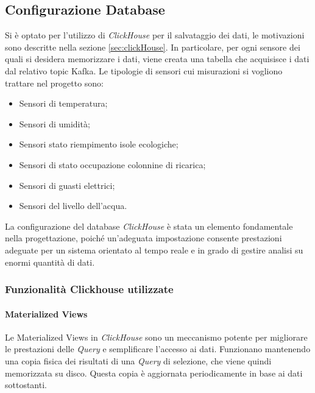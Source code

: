 \subsection{Configurazione Database}
Si è optato per l'utilizzo di \textit{ClickHouse} per il salvataggio dei dati, le motivazioni sono descritte nella sezione \ref{sec:clickHouse}. In particolare, per ogni sensore dei quali si desidera memorizzare i dati, viene creata una tabella che acquisisce i dati dal relativo topic Kafka.
Le tipologie di sensori cui misurazioni si vogliono trattare nel progetto sono:
\begin{itemize}
    \item Sensori di temperatura;
    \item Sensori di umidità;
    \item Sensori stato riempimento isole ecologiche;
    \item Sensori di stato occupazione colonnine di ricarica;
    \item Sensori di guasti elettrici;
    \item Sensori del livello dell'acqua.
\end{itemize}

La configurazione del database \textit{ClickHouse} è stata un elemento fondamentale nella progettazione, poiché un'adeguata impostazione consente prestazioni adeguate per un sistema orientato al tempo reale e in grado di gestire analisi su enormi quantità di dati.

\subsubsection{Funzionalità Clickhouse utilizzate}
\paragraph{Materialized Views}
Le Materialized Views in \textit{ClickHouse} sono un meccanismo potente per migliorare le prestazioni delle \textit{Query} e semplificare l'accesso ai dati. Funzionano mantenendo una copia fisica dei risultati di una \textit{Query} di selezione, che viene quindi memorizzata su disco. Questa copia è aggiornata periodicamente in base ai dati sottostanti.

